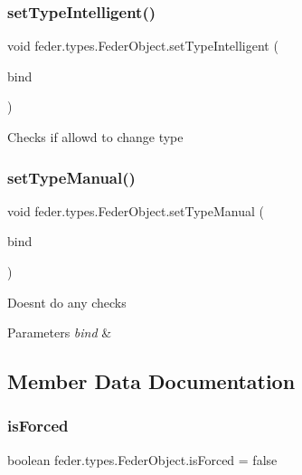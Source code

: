 \subsubsection{\texorpdfstring{set\+Type\+Intelligent()}{setTypeIntelligent()}}
{\footnotesize\ttfamily void feder.\+types.\+Feder\+Object.\+set\+Type\+Intelligent (\begin{DoxyParamCaption}\item[{\hyperlink{classfeder_1_1types_1_1FederBinding}{Feder\+Binding}}]{bind }\end{DoxyParamCaption})}

Checks if allowd to change type \mbox{\label{classfeder_1_1types_1_1FederObject_a474b468bf57e328bcc31b10a2e2cb346}} 
\subsubsection{\texorpdfstring{set\+Type\+Manual()}{setTypeManual()}}
{\footnotesize\ttfamily void feder.\+types.\+Feder\+Object.\+set\+Type\+Manual (\begin{DoxyParamCaption}\item[{\hyperlink{classfeder_1_1types_1_1FederBinding}{Feder\+Binding}}]{bind }\end{DoxyParamCaption})}

Doesn\textquotesingle{}t do any checks 
\begin{DoxyParams}{Parameters}
{\em bind} & \\
\hline
\end{DoxyParams}


\subsection{Member Data Documentation}
\mbox{\label{classfeder_1_1types_1_1FederObject_ae0f93d5fc5f91116c42ec7818470d87b}} 
\subsubsection{\texorpdfstring{is\+Forced}{isForced}}
{\footnotesize\ttfamily boolean feder.\+types.\+Feder\+Object.\+is\+Forced = false}

